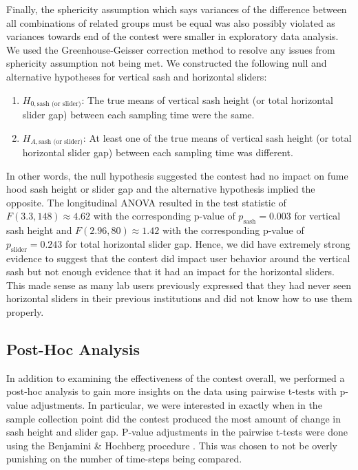 \documentclass[12pt, twocolumn]{article}
\begin{document}
Finally, the sphericity assumption which says variances of the difference between all combinations of related groups must be equal was also possibly violated as variances towards end of the contest were smaller in exploratory data analysis. We used the Greenhouse-Geisser correction method to resolve any issues from sphericity assumption not being met. We constructed the following null and alternative hypotheses for vertical sash and horizontal sliders:
\begin{enumerate}
\item[ ] $H_{0, \text{sash (or slider)}}$: The true means of vertical sash height (or total horizontal slider gap) between each sampling time were the same.
\item[ ] $H_{A, \text{sash (or slider)}}$: At least one of the true means of vertical sash height (or total horizontal slider gap) between each sampling time was different.
\end{enumerate}
In other words, the null hypothesis suggested the contest had no impact on fume hood sash height or slider gap and the alternative hypothesis implied the opposite. The longitudinal ANOVA resulted in the test statistic of $F(3.3, 148) \approx 4.62$ with the corresponding p-value of $p_{\text{sash}} = 0.003$ for vertical sash height and $F(2.96, 80) \approx 1.42$ with the corresponding p-value of $p_{\text{slider}} = 0.243$ for total horizontal slider gap. Hence, we did have extremely strong evidence to suggest that the contest did impact user behavior around the vertical sash but not enough evidence that it had an impact for the horizontal sliders. This made sense as many lab users previously expressed that they had never seen horizontal sliders in their previous institutions and did not know how to use them properly. 

\subsection*{Post-Hoc Analysis}\label{Sec:PostHoc}
In addition to examining the effectiveness of the contest overall, we performed a post-hoc analysis to gain more insights on the data using pairwise t-tests with p-value adjustments. In particular, we were interested in exactly when in the sample collection point did the contest produced the most amount of change in sash height and slider gap. P-value adjustments in the pairwise t-tests were done using the Benjamini \& Hochberg procedure \cite{BH}. This was chosen to not be overly punishing on the number of time-steps being compared.
\end{document}
